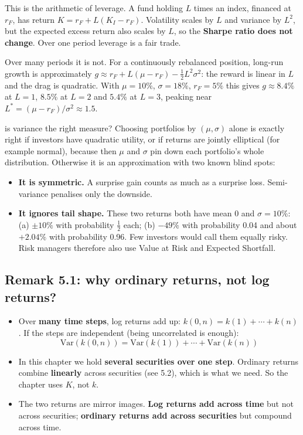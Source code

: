 \documentclass[titlepage,11pt,a4paper]{article}
\newcommand{\Var}{\mathrm{Var}}
\begin{document}
\begin{practice}
This is the arithmetic of leverage. A fund holding $L$ times an index, financed at $r_F$, has return $K=r_F+L(K_I-r_F)$. Volatility scales by $L$ and variance by $L^2$, but the expected excess return also scales by $L$, so the \textbf{Sharpe ratio does not change}. Over one period leverage is a fair trade.

Over many periods it is not. For a continuously rebalanced position, long-run growth is approximately $g\approx r_F+L(\mu-r_F)-\tfrac12L^2\sigma^2$: the reward is linear in $L$ and the drag is quadratic. With $\mu=10\%$, $\sigma=18\%$, $r_F=5\%$ this gives $g\approx8.4\%$ at $L=1$, $8.5\%$ at $L=2$ and $5.4\%$ at $L=3$, peaking near $L^*=(\mu-r_F)/\sigma^2\approx1.5$.
\end{practice}

\begin{deeper}{is variance the right measure?}
Choosing portfolios by $(\mu,\sigma)$ alone is exactly right if investors have quadratic utility, or if returns are jointly elliptical (for example normal), because then $\mu$ and $\sigma$ pin down each portfolio's whole distribution. Otherwise it is an approximation with two known blind spots:
\begin{itemize}
  \item \textbf{It is symmetric.} A surprise gain counts as much as a surprise loss. Semi-variance penalises only the downside.
  \item \textbf{It ignores tail shape.} These two returns both have mean 0 and $\sigma=10\%$: (a) $\pm10\%$ with probability $\tfrac12$ each; (b) $-49\%$ with probability 0.04 and about $+2.04\%$ with probability 0.96. Few investors would call them equally risky. Risk managers therefore also use Value at Risk and Expected Shortfall.
\end{itemize}
\end{deeper}

\subsection{Remark 5.1: why ordinary returns, not log returns?}
\begin{itemize}
  \item Over \textbf{many time steps}, log returns add up: $k(0,n)=k(1)+\cdots+k(n)$. If the steps are independent (being uncorrelated is enough):
  \[\Var(k(0,n))=\Var(k(1))+\cdots+\Var(k(n))\]
  \item In this chapter we hold \textbf{several securities over one step}. Ordinary returns combine \textbf{linearly} across securities (see 5.2), which is what we need. So the chapter uses $K$, not $k$.
  \item The two returns are mirror images. \textbf{Log returns add across time} but not across securities; \textbf{ordinary returns add across securities} but compound across time.
\end{itemize}
\end{document}
